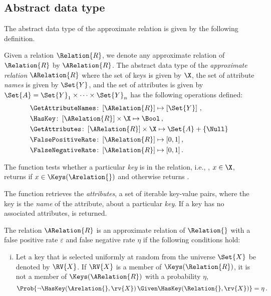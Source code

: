 \documentclass[ ../main.tex]{subfiles}
\begin{document}
\subsection{Abstract data type}
The abstract data type of the approximate relation is given by the following definition.
\begin{definition}
\label{def:approx_rel}
Given a relation $\Relation{R}$, we denote any approximate relation of $\Relation{R}$ by $\ARelation{R}$. The abstract data type of the \emph{approximate relation} $\ARelation{R}$ where the set of keys is given by $\X$, the set of attribute \emph{names} is given by $\Set{Y}$, and the set of attributes is given by $\Set{A} = \Set{Y}_1 \times \cdots \times \Set{Y}_n$ has the following operations defined:
\begin{align}
    &\GetAttributeNames \colon \left[\ARelation{R}\right] \mapsto \left[\Set{Y}\right]\,,\\
    &\HasKey \colon \left[\ARelation{R}\right] \times \X \mapsto \Bool\,,\\
    &\GetAttributes \colon \left[\ARelation{R}\right] \times \X \mapsto \Set{A} + \{ \Null \}\,\,\\
    &\FalsePositiveRate \colon \left[\ARelation{R}\right] \mapsto [0,1]\,,\\
    &\FalseNegativeRate \colon \left[\ARelation{R}\right] \mapsto [0,1]\,.
\end{align}

The \HasKey function tests whether a particular \emph{key} is in the relation, i.e., , $x \in \X$, returns \True if $x \in \Keys(\Arelation{})$ and otherwise returns \False.

The \GetAttributes function retrieves the \emph{attributes}, a set of iterable key-value pairs, where the key is the \emph{name} of the attribute, about a particular \emph{key}. If a key has no associated attributes, \nullvalue is returned.

The relation $\ARelation{R}$ is an approximate relation of $\Relation{}$ with a false positive rate $\varepsilon$ and false negative rate $\eta$ if the following conditions hold:
\begin{enumerate}[(i)]
    \item Let a key that is selected uniformly at random from the universe $\Set{X}$ be denoted by $\RV{X}$. If $\RV{X}$ is a member of $\Keys(\Relation{R})$, it is not a member of $\Keys(\ARelation{R})$ with a probability $\eta$,
    \begin{equation}
        \Prob{\neg \HasKey\!\left(\Arelation{},\rv{X}\right) \Given \HasKey\!\left(\Relation{},\rv{X}\right)} = \eta\,.
    \end{equation}
    

\end{enumerate}
\end{definition}
\end{document}
